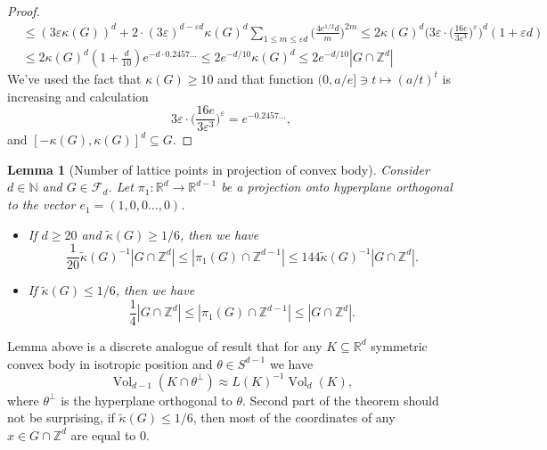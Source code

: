 \documentclass[a4paper,oneside, reqno]{amsart}
\numberwithin{equation}{section}
\newtheorem{Lem}[Thm]{Lemma}
\theoremstyle{definition}%
\theoremstyle{definition}
\theoremstyle{definition}%
\theoremstyle{definition}
\newcommand{\Z}{\mathbb{Z}}
\newcommand{\R}{\mathbb{R}}
\newcommand{\N}{\mathbb{N}}
\DeclareMathOperator{\Vol}{Vol}
\begin{document}
\begin{proof}
\begin{equation}
\begin{split}
    &\le (3\varepsilon \kappa(G))^d+2 \cdot (3\varepsilon)^{d-\varepsilon d} \kappa(G)^d \sum_{1 \le m \le \varepsilon d}  \Big( \frac{4 e^{1/2}d}{m} \Big)^{2m} \le 2 \kappa(G)^d \Big( 3 \varepsilon \cdot \Big(\frac{16e}{3\varepsilon^3} \Big)^{\varepsilon} \Big)^d (1+ \varepsilon d) \\
    &\le 2 \kappa(G)^d (1+ \frac{d}{10}) e^{-d \cdot 0.2457...} \le 2 e^{-d/10}  \kappa(G)^d \le 2 e^{-d/10} |G \cap \Z^d|
    \end{split}
\end{equation}
We've used the fact that $\kappa(G) \ge 10$ and that function $(0,a/e] \ni t \mapsto (a/t)^t$ is increasing and calculation
\[
3 \varepsilon \cdot \Big(\frac{16e}{3\varepsilon^3} \Big)^{\varepsilon}=e^{- 0.2457...},
\]
and $[-\kappa(G), \kappa(G)]^d \subseteq G$.
\end{proof}
\begin{Lem}[Number of lattice points in projection of convex body] \label{dim_comp}
    Consider $d \in \N$ and $G \in \mathcal{F}_d$. Let $\pi_1 : \R^d \to \R^{d-1}$ be a projection onto hyperplane orthogonal to the vector $e_1=(1,0,0 \ldots, 0)$.
    \begin{itemize}
        \item If $d \ge 20$ and $\widetilde{\kappa}(G) \ge 1/6$, then we have
    \[
   \frac{1}{20} \widetilde{\kappa}(G)^{-1} |G \cap \Z^d| \le | \pi_1(G) \cap \Z^{d-1} | \le 144 \widetilde{\kappa}(G)^{-1} |G \cap \Z^d|.
    \]
    \item If $\widetilde{\kappa}(G) \le 1/6$, then we have
    \[
   \frac{1}{4} |G \cap \Z^d| \le | \pi_1(G) \cap \Z^{d-1} | \le  |G \cap \Z^d|.
    \]
    \end{itemize}
\end{Lem}
Lemma above is a discrete analogue of result that for any $K \subseteq \R^d$ symmetric convex body in isotropic position and $\theta \in S^{d-1}$ we have
    \[
    \Vol_{d-1}(K \cap \theta^\perp) \approx L(K)^{-1} \Vol_d(K),
    \]
    where $\theta^\perp$ is the hyperplane orthogonal to $\theta$.
Second part of the theorem should not be surprising, if $\widetilde{\kappa}(G) \le 1/6$, then most of the coordinates of any $x \in G \cap \Z^d$ are equal to $0$.
\end{document}
